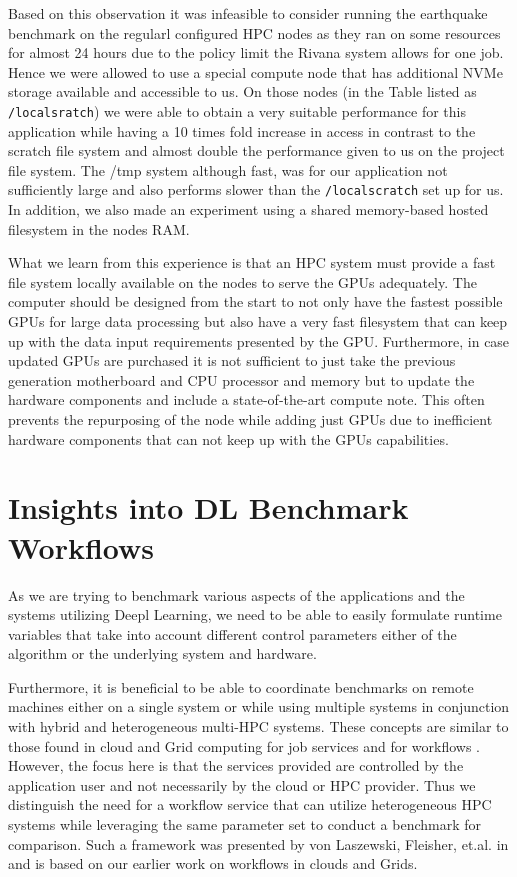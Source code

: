 \documentclass[utf8]{FrontiersinVancouver} %
\begin{document}
  Based on this observation it was infeasible to consider running the
  earthquake benchmark on the regularl configured HPC nodes as they
  ran on some resources for almost 24 hours due to the policy limit
  the Rivana system allows for one job. Hence we were allowed to use a
  special compute node that has additional NVMe storage available and
  accessible to us. On those nodes (in the Table listed as
  \verb|/localsratch|) we were able to obtain a very suitable
  performance for this application while having a 10 times fold
  increase in access in contrast to the scratch file system and almost
  double the performance given to us on the project file system. The
  /tmp system although fast, was for our application not sufficiently
  large and also performs slower than the \verb|/localscratch| set up
  for us. In addition, we also made an experiment using a shared
  memory-based hosted filesystem in the nodes RAM.

  What we learn from this experience is that an HPC system must
  provide a fast file system locally available on the nodes to serve
  the GPUs adequately. The computer should be designed from the start
  to not only have the fastest possible GPUs for large data processing
  but also have a very fast filesystem that can keep up with the data
  input requirements presented by the GPU. Furthermore, in case
  updated GPUs are purchased it is not sufficient to just take the
  previous generation motherboard and CPU processor and memory but to
  update the hardware components and include a state-of-the-art
  compute note. This often prevents the repurposing of the node while
  adding just GPUs due to inefficient hardware components that can not
  keep up with the GPUs capabilities.

  


\section{Insights into DL Benchmark Workflows}
\label{sec:workflow-main}

As we are trying to benchmark various aspects of the applications and
the systems utilizing Deepl Learning, we need to be able to easily
formulate runtime variables that take into account different control
parameters either of the algorithm or the underlying system and
hardware.

Furthermore, it is beneficial to be able to coordinate benchmarks on
remote machines either on a single system or while using multiple
systems in conjunction with hybrid and heterogeneous multi-HPC
systems. These concepts are similar to those found in cloud and Grid
computing for job services \citep{las-infogram} and for workflows
\citep{las-workflow,las07-workflow}. However, the focus here is that
the services provided are controlled by the application user and not
necessarily by the cloud or HPC provider. Thus we distinguish the need
for a workflow service that can utilize heterogeneous HPC systems
while leveraging the same parameter set to conduct a benchmark for
comparison. Such a framework was presented by von Laszewski, Fleisher,
et.al. in \citep{las-22-arxiv-workflow-cc} and is based on our earlier
work on workflows in clouds and Grids.
\end{document}
